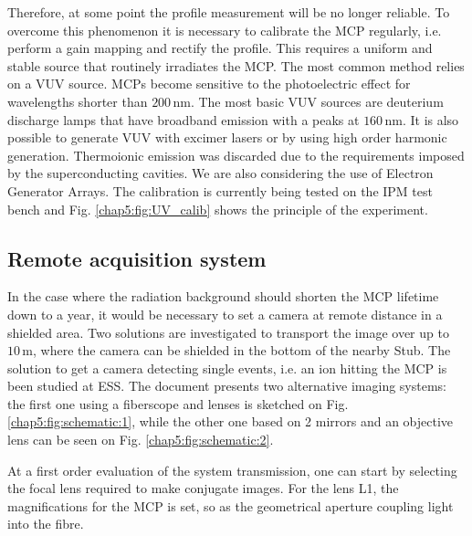 Therefore, at some point the profile measurement will be no longer reliable. To overcome this phenomenon it is necessary to calibrate the MCP regularly, i.e. perform a gain mapping and rectify the profile. This requires a uniform and stable source that routinely irradiates the MCP. The most common method relies on a VUV source. MCPs become sensitive to the photoelectric effect for wavelengths shorter than $200\,\mathrm{nm}$. The most basic VUV sources are deuterium discharge lamps that have broadband emission with a peaks at $160\,\mathrm{nm}$. It is also possible to generate VUV with excimer lasers or by using high order harmonic generation. Thermoionic emission was discarded due to the requirements imposed by the superconducting cavities. We are also considering the use of Electron Generator Arrays. The calibration is currently being tested on the IPM test bench and Fig. \ref{chap5:fig:UV_calib} shows the principle of the experiment.

\subsection*{Remote acquisition system}

In the case where the radiation background should shorten the MCP lifetime down to a year, it would be necessary to set a camera at remote distance in a shielded area. Two solutions are investigated to transport the image over up to $10\,\mathrm{m}$, where the camera can be shielded in the bottom of the nearby Stub. The solution to get a camera detecting single events, i.e. an ion hitting the MCP is been studied at ESS. The document presents two alternative imaging systems: the first one using a fiberscope and lenses is sketched on Fig. \ref{chap5:fig:schematic:1}, while the other one based on 2 mirrors and an objective lens can be seen on Fig. \ref{chap5:fig:schematic:2}.



At a first order evaluation of the system transmission, one can start by selecting the focal lens required to make conjugate images. For the lens L1, the magnifications for the MCP is set, so as the geometrical aperture coupling light into the fibre.


